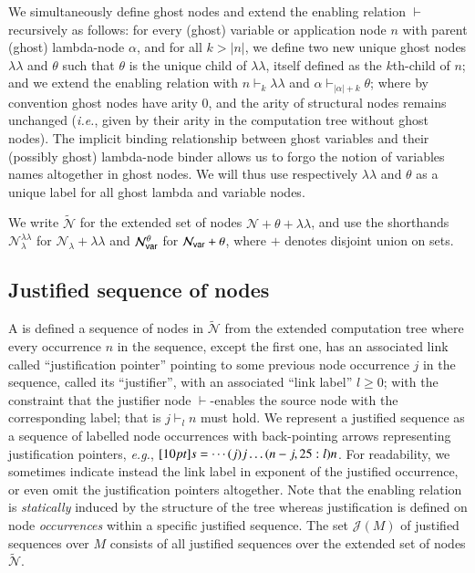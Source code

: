 \documentclass{elsarticle}
\makeatletter
\theoremstyle{plain}
\theoremstyle{definition}
\theoremstyle{remark}
\newcommand\Nodes{\mathcal{N}}%
\newcommand\NodesVar{\Nodes_{\sf var}}%
\newcommand\NodesLmd{\Nodes_\lambda}%
\newcommand\ExtendedNodes{\tilde{\Nodes}}
\newcommand{\ghostlmd}{{\lambda\!\!\lambda}}
\newcommand{\ghostvar}{\theta}
\newcommand\ImNodesVar{\NodesVar^\ghostvar}
\newcommand\ImNodesLmd{\NodesLmd^\ghostlmd}
\newcommand{\enables}{\vdash} %
\renewcommand\ie{{\it i.e.\@\xspace}}
\renewcommand\eg{{\it e.g.\@\xspace}}
\def\justseqset{\mathcal{J}}
\makeatother
\begin{document}
We simultaneously define ghost nodes and extend the enabling relation $\enables$ recursively as follows: for every (ghost) variable or application node $n$ with parent (ghost) lambda-node $\alpha$, and for all $k>|n|$, we define two new unique ghost nodes $\ghostlmd$ and $\ghostvar$
such that
$\ghostvar$ is the unique child of $\ghostlmd$, itself defined as the $k$th-child of $n$;
and we extend the enabling relation with $n \enables_k \ghostlmd$
and $\alpha \enables_{|\alpha|+ k} \ghostvar$; where by convention ghost nodes have arity $0$, and the arity of structural nodes remains unchanged (\ie, given by their arity in the computation tree without ghost nodes).
The implicit binding relationship between ghost variables and their (possibly ghost) lambda-node binder allows us to forgo the notion of variables names altogether in ghost nodes. We will thus
use respectively $\ghostlmd$ and $\ghostvar$ as a unique label for all ghost lambda and variable nodes.

We write $\ExtendedNodes$ for the extended set of nodes $\Nodes + \ghostvar + \ghostlmd$, and use the shorthands $\ImNodesLmd$ for $\NodesLmd + \ghostlmd$ and $\ImNodesVar$ for $\NodesVar + \ghostvar$, where $+$ denotes disjoint union on sets.

\subsection{Justified sequence of nodes}
\label{sec:justseq}

A  is defined a sequence of nodes in $\ExtendedNodes$ from the extended computation tree where every occurrence $n$ in the sequence, except the first one, has an associated link called ``justification pointer'' pointing to some previous node occurrence $j$ in the sequence, called its ``justifier'', with an associated ``link label'' $l\geq0$; with the constraint that the justifier node $\enables$-enables the source node with the corresponding label; that is $j \enables_l n$ must hold. We represent a justified sequence as a sequence of labelled node occurrences with back-pointing arrows representing justification pointers, \eg, $\Pstr[10pt]{ s = \cdots (j){j} \ldots (n-j,25:l){n} }$.
For readability, we sometimes indicate instead the link label in exponent of the justified occurrence, or even omit the justification pointers altogether.
Note that the enabling relation is \emph{statically} induced by the structure of the tree whereas justification is defined on node \emph{occurrences} within a specific justified sequence. The set $\justseqset(M)$ of justified sequences over $M$ consists of all justified sequences over the extended set of nodes $\ExtendedNodes$.
\end{document}
